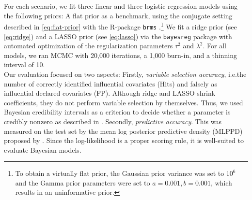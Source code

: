 For each scenario, we fit three linear and three logistic regression models using the following priors: A flat prior as a benchmark, using the conjugate setting described in \autoref{eq:flat-prior} with the R-package \texttt{brms} \citep{brms_2017}.\footnote{To obtain a virtually flat prior, the Gaussian prior variance was set to $10^6$ and the Gamma prior parameters were set to $a = 0.001, b=0.001$, which results in an uninformative prior.} 
We fit a ridge prior (see \autoref{eq:ridge}) and a LASSO prior (see \autoref{eq:lasso}) via the \texttt{bayesreg} package \citep{makalic_bayesreg_2016} with automated optimization of the regularization parameters $\tau^2$ and $\lambda^2$.
For all models, we ran MCMC with 20,000 iterations, a 1,000 burn-in, and a thinning interval of 10.\\

Our evaluation focused on two aspects:
Firstly, \textit{variable selection accuracy}, i.e.\@ the number of correctly identified influential covariates (Hits) and falsely as influential declared covariates (FP).
Although ridge and LASSO shrink coefficients, they do not perform variable selection by themselves.
Thus, we used Bayesian credibility intervals as a criterion to decide whether a parameter is credibly nonzero as described in \citet{van_erp_shrinkage_2019}.
Secondly, \textit{predictive accuracy}.
This was measured on the test set by the mean log posterior predictive density (MLPPD) proposed by \citet{gelman_understanding_2013}.
Since the log-likelihood is a proper scoring rule, it is well-suited to evaluate Bayesian models.\\

